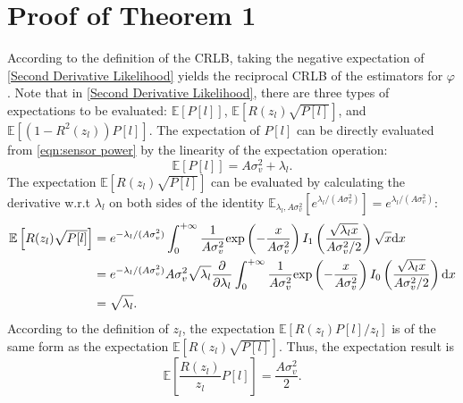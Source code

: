 \documentclass[journal,twocolumn]{IEEEtran}
\theoremstyle{nonumberplain}
\def \exp {\text{exp}}
\begin{document}
\section{Proof of \textbf{Theorem 1}}\label{appendix:proof of theorem1}
    According to the definition of the CRLB, taking the negative expectation of \eqref{Second Derivative Likelihood} yields the reciprocal CRLB of the estimators for $\varphi$. Note that in \eqref{Second Derivative Likelihood}, there are three types of expectations to be evaluated: $\mathbb{E}\left[P[l]\right]$, $\mathbb{E}\left[R(z_l)\sqrt{P[l]}\right]$, and $\mathbb{E}\left[(1-R^2(z_l))P[l]\right]$. The expectation of $P[l]$ can be directly evaluated from \eqref{eqn:sensor power} by the linearity of the expectation operation:
    \begin{equation}
        \mathbb{E}\left[P[l]\right] = A\sigma_v^2 + \lambda_l.
        \label{eqn:expectation of P_l}
    \end{equation}
    The expectation $\mathbb{E}\left[R(z_l) \sqrt{P[l]}\right]$ can be evaluated by calculating the derivative w.r.t $\lambda_l$ on both sides of the identity $\mathbb{E}_{\lambda_l, A\sigma_v^2}[e^{\lambda_l/(A\sigma_v^2)}]=e^{\lambda_l/(A\sigma_v^2)}$:
    \begin{equation}
        \begin{aligned}
            \mathbb{E}\left[R(z_l) \sqrt{P[l]}\right] & = e^{-\lambda_l/(A\sigma_v^2)}\int_{0}^{+\infty}{\frac{1}{A\sigma_v^2}\exp\left(-\frac{x}{A\sigma_v^2}\right)I_1\left(\frac{\sqrt{\lambda_l x}}{A\sigma_v^2/2}\right)\sqrt{x}{\rm d}x} \\
            & = e^{-\lambda_l/(A\sigma_v^2)} A\sigma_v^2 \sqrt{\lambda_l} \frac{\partial}{\partial\lambda_l} \int_{0}^{+\infty}{\frac{1}{A\sigma_v^2}\exp\left(-\frac{x}{A\sigma_v^2}\right)I_0\left(\frac{\sqrt{\lambda_l x}}{A\sigma_v^2/2}\right) {\rm d}x}\\
            & = \sqrt{\lambda_l}.\\
        \end{aligned}
        \label{eqn:expectation_second_kind_1}
    \end{equation}
    According to the definition of $z_l$, the expectation $\mathbb{E}\left[R(z_l)P[l]/z_l\right]$ is of the same form as the expectation $\mathbb{E}\left[R(z_l) \sqrt{P[l]}\right]$. Thus, the expectation result is
    \begin{equation}
        \mathbb{E}\left[\frac{R(z_l)}{z_l} P[l]\right] = \frac{A\sigma_v^2}{2}.
        \label{eqn:expectation_second_kind_2}
    \end{equation}
\end{document}
